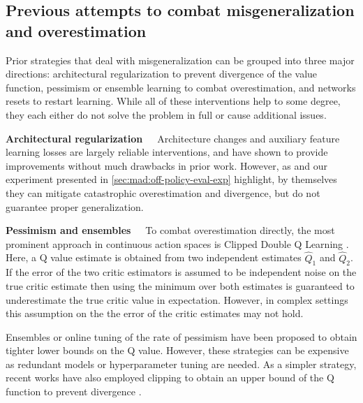 \subsection{Previous attempts to combat misgeneralization and overestimation}
\label{sec:mad:prior}
Prior strategies that deal with misgeneralization can be grouped into three major directions: architectural regularization to prevent divergence of the value function, pessimism or ensemble learning to combat overestimation, and networks resets to restart learning.
While all of these interventions help to some degree, they each either do not solve the problem in full or cause additional issues.

\textbf{Architectural regularization}~~~Architecture changes \parencite{hussing2024dissecting,nauman2024overestimation,nauman2024bigger,lyle2024disentangling} and auxiliary feature learning losses \parencite{schwarzer2021dataefficient,zhao2023simplified,ni2024bridging,voelcker2024when} are largely reliable interventions, and have shown to provide improvements without much drawbacks in prior work.
However, as \textcite{hussing2024dissecting} and our experiment presented in \autoref{sec:mad:off-policy-eval-exp} highlight, by themselves they can mitigate catastrophic overestimation and divergence, but do not guarantee proper generalization. %

\textbf{Pessimism and ensembles}~~~To combat overestimation directly, the most prominent approach in continuous action spaces is Clipped Double Q Learning \parencite{fujimoto2018addressing}. 
Here, a Q value estimate is obtained from two independent estimates $\hat{Q}_1$ and $\hat{Q}_2$.
If the error of the two critic estimators is assumed to be independent noise on the true critic estimate 
then using the minimum over both estimates is guaranteed to underestimate the true critic value in expectation.
However, in complex settings this assumption on the the error of the critic estimates may not hold. 

Ensembles \parencite{lan2020maxmin,chen2020randomized,hiraoka2022dropout,farebrother2023protovalue} or online tuning of the rate of pessimism \parencite{moskovitz2021tactical} have been proposed to obtain tighter lower bounds on the Q value.
However, these strategies can be expensive as redundant models or hyperparameter tuning are needed.
As a simpler strategy, recent works have also employed clipping to obtain an upper bound of the Q function to prevent divergence \parencite{fujimoto2024sale}.

